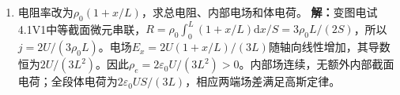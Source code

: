 \documentclass[UTF8,fontset=fandol,a4paper,11pt]{ctexart}
\begin{document}
\begin{enumerate}
\item 电阻率改为$\rho_0(1+x/L)$，求总电阻、内部电场和体电荷。
\textbf{解：}变图电试4.1V1中等截面微元串联，$R=\rho_0\int_0^L(1+x/L)\mathrm dx/S=3\rho_0L/(2S)$，所以$j=2U/(3\rho_0L)$。电场$E_x=2U(1+x/L)/(3L)$随轴向线性增加，其导数恒为$2U/(3L^2)$。因此$\rho_e=2\varepsilon_0U/(3L^2)>0$。内部场连续，无额外内部截面电荷；全段体电荷为$2\varepsilon_0US/(3L)$，相应两端场差满足高斯定律。
\begin{center}\begin{minipage}{.98\linewidth}\centering
{}
\end{minipage}
\end{center}
\end{enumerate}
\end{document}
